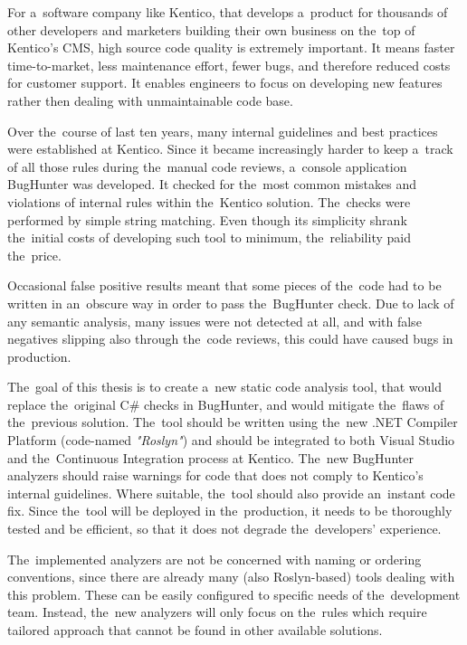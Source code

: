 \documentclass[
  digital, %
  table,   %
  lof,     %
  lot,     %
  oneside,
]{fithesis3}
\begin{document}
For a~software company like Kentico, that develops a~product for thousands of other developers and marketers building their own business on the~top of Kentico's CMS, high source code quality is extremely important. It means faster time-to-market, less maintenance effort, fewer bugs, and therefore reduced costs for customer support. It enables engineers to focus on developing new features rather then dealing with unmaintainable code base. 


Over the~course of last ten years, many internal guidelines and best practices were established at Kentico. Since it became increasingly harder to keep a~track of all those rules during the~manual code reviews, a~console application BugHunter was developed. It checked for the~most common mistakes and violations of internal rules within the~Kentico solution. The~checks were performed by simple string matching. Even though its simplicity shrank the~initial costs of developing such tool to minimum, the~reliability paid the~price. 

Occasional false positive results meant that some pieces of the~code had to be written in an~obscure way in order to pass the~BugHunter check. Due to lack of any semantic analysis, many issues were not detected at all, and with false negatives slipping also through the~code reviews, this could have caused bugs in production. 

The~goal of this thesis is to create a~new static code analysis tool, that would replace the~original C\# checks in BugHunter, and would mitigate the~flaws of the~previous solution. The~tool should be written using the~new .NET Compiler Platform (code-named \textit{"Roslyn"}) and should be integrated to both Visual Studio and the~Continuous Integration process at Kentico. The~new BugHunter analyzers should raise warnings for code that does not comply to Kentico's internal guidelines. Where suitable, the~tool should also provide an~instant code fix. Since the~tool will be deployed in the~production, it needs to be thoroughly tested and be efficient, so that it does not degrade the~developers' experience.

The~implemented analyzers are not be concerned with naming or ordering conventions, since there are already many (also Roslyn-based) tools dealing with this problem. These can be easily configured to specific needs of the~development team. Instead, the~new analyzers will only focus on the~rules which require tailored approach that cannot be found in other available solutions. 
\end{document}
